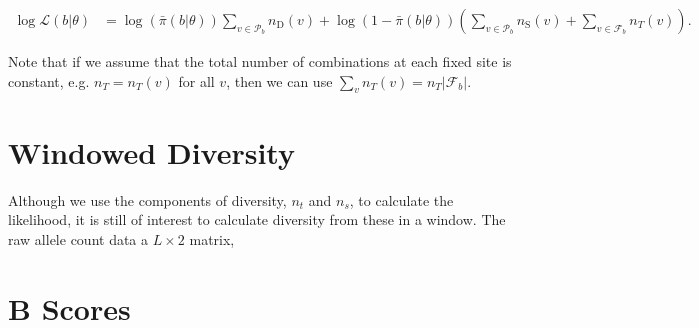 \documentclass[11pt]{article}
\begin{document}
\begin{align}
  \log\mathcal{L}(b | \theta)  &= \log(\bar{\pi}(b | \theta)) \sum_{v \in \mathcal{P}_b} n_\text{D}(v) + \log(1-\bar{\pi}(b | \theta)) \left(\sum_{v \in \mathcal{P}_b} n_\text{S}(v) +  \sum_{v \in \mathcal{F}_b} n_T(v)  \right).
\end{align}

Note that if we assume that the total number of combinations at each fixed site
is constant, e.g. $n_T = n_T(v)$ for all $v$, then we can use $\sum_v n_T(v) =
n_T |\mathcal{F}_b|$.



\section*{Windowed Diversity}

Although we use the components of diversity, $n_t$ and $n_s$, to calculate the
likelihood, it is still of interest to calculate diversity from these in a
window. The raw allele count data a $L \times \text{2}$ matrix, 

\section{B Scores}
\end{document}

